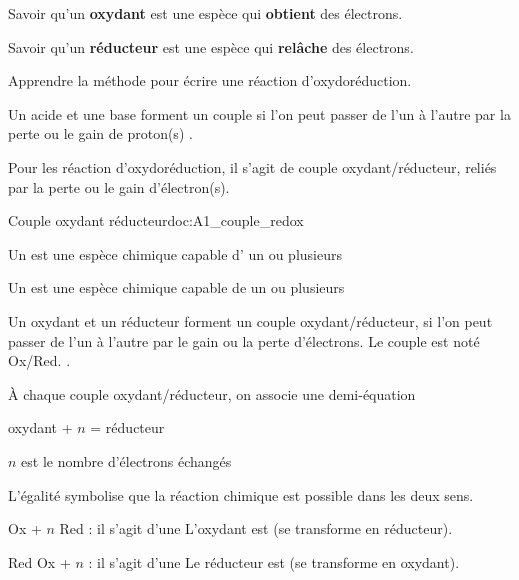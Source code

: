 \tetePremStssRedo

\vspace*{-36pt}


\begin{objectifs}
  \item Savoir qu'un \textbf{oxydant} est une espèce qui \textbf{obtient} des électrons.
  \item Savoir qu'un \textbf{réducteur} est une espèce qui \textbf{relâche} des électrons.
  \item Apprendre la méthode pour écrire une réaction d'oxydoréduction.
\end{objectifs}

\begin{contexte}
  Un acide et une base forment un couple si l'on peut passer de l'un à l'autre par la perte ou le gain de proton(s) .

  Pour les réaction d'oxydoréduction, il s'agit de couple oxydant/réducteur, reliés par la perte ou le gain d'électron(s).
  
\end{contexte}


\begin{doc}{Couple oxydant réducteur}{doc:A1_couple_redox}
  \begin{encart}  
    Un  est une espèce chimique capable d' un ou plusieurs 

    Un  est une espèce chimique capable de  un ou plusieurs 
  \end{encart}

  Un oxydant et un réducteur forment un couple oxydant/réducteur, si l'on peut passer de l'un à l'autre par le gain ou la perte d'électrons.
  Le couple est noté Ox/Red. .

  À chaque couple oxydant/réducteur, on associe une demi-équation
  \begin{center}
    oxydant + $n$  = réducteur

    $n$ est le nombre d'électrons échangés
  \end{center}
  \vspace*{-4pt}
  L'égalité symbolise que la réaction chimique est possible dans les deux sens.
  
  \begin{encart}
    \begin{listePoints}
      \item Ox + $n$  \!\!\reaction Red
      : il s'agit d'une 
      L'oxydant est  (se transforme en réducteur).
      \item  Red \!\!\reaction Ox + $n$ 
      : il s'agit d'une 
      Le réducteur est  (se transforme en oxydant).
    \end{listePoints}
  \end{encart}
\end{doc}

